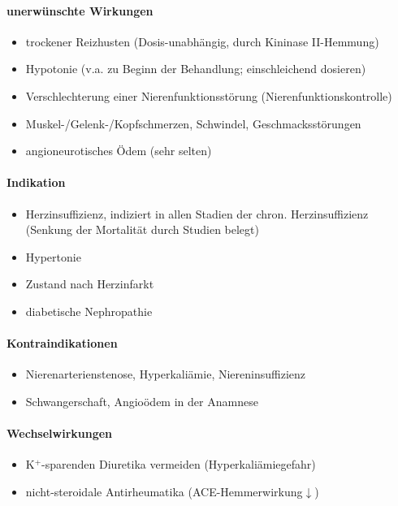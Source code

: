 \documentclass[10pt,a4paper]{report}
\begin{document}
\paragraph{unerwünschte Wirkungen}
\begin{itemize}
	\item trockener Reizhusten (Dosis-unabhängig, durch Kininase II-Hemmung)
	\item Hypotonie (v.a. zu Beginn der Behandlung; einschleichend dosieren)
	\item Verschlechterung einer Nierenfunktionsstörung (Nierenfunktionskontrolle)
	\item Muskel-/Gelenk-/Kopfschmerzen, Schwindel, Geschmacksstörungen
	\item angioneurotisches Ödem (sehr selten)
\end{itemize}
\paragraph{Indikation}
\begin{itemize}
	\item Herzinsuffizienz, indiziert in allen Stadien der chron. Herzinsuffizienz 
  (Senkung der Mortalität durch Studien belegt)
	\item Hypertonie
	\item Zustand nach Herzinfarkt
	\item diabetische Nephropathie
\end{itemize}
\paragraph{Kontraindikationen}
\begin{itemize}
	\item Nierenarterienstenose, Hyperkaliämie, Niereninsuffizienz
	\item Schwangerschaft, Angioödem in der Anamnese
\end{itemize}
\paragraph{Wechselwirkungen}
\begin{itemize}
	\item K$^+$-sparenden Diuretika vermeiden (Hyperkaliämiegefahr)
	\item nicht-steroidale Antirheumatika (ACE-Hemmerwirkung$\downarrow$)
\end{itemize}
\end{document}

